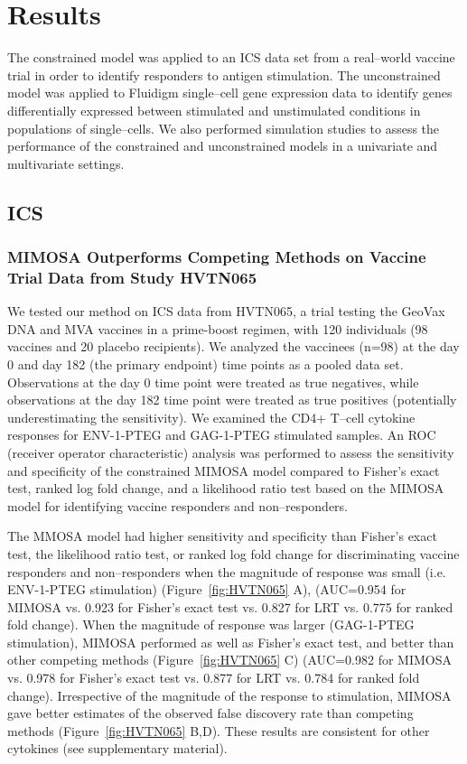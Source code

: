 \documentclass[11pt]{article}
\begin{document}
\section{Results}
The constrained model was applied to an ICS data set from a real--world vaccine trial in order to identify responders to antigen stimulation. The unconstrained model was applied to Fluidigm single--cell gene expression data to identify genes differentially expressed between stimulated and unstimulated conditions in populations of single--cells. We also performed simulation studies to assess the performance of the constrained and unconstrained models in a univariate and multivariate settings.

\subsection{ICS}
\subsubsection*{MIMOSA Outperforms Competing Methods on Vaccine Trial Data from Study HVTN065}

We tested our method on ICS data from HVTN065,  a trial testing the GeoVax DNA and MVA vaccines in a prime-boost regimen, with 120 individuals (98 vaccines and 20 placebo recipients). We analyzed the vaccinees (n=98) at the day 0 and day 182 (the primary endpoint) time points as a pooled data set. Observations at the day 0 time point were treated as true negatives, while observations at the day 182 time point were treated as true positives (potentially underestimating the sensitivity). We examined the CD4+ T--cell cytokine responses for ENV-1-PTEG and GAG-1-PTEG stimulated samples. An ROC (receiver operator characteristic) analysis was performed to assess the sensitivity and specificity of the constrained MIMOSA model compared to Fisher's exact test, ranked log fold change, and a likelihood ratio test based on the MIMOSA model for identifying vaccine responders and non--responders. 

The MMOSA model had higher sensitivity and specificity than Fisher's exact test, the likelihood ratio test, or ranked log fold change for discriminating vaccine responders and non--responders when the magnitude of response was small (i.e. ENV-1-PTEG stimulation) (Figure~\ref{fig:HVTN065} A),  (AUC=0.954 for MIMOSA vs. 0.923 for Fisher's exact test vs. 0.827 for LRT vs. 0.775 for ranked fold change). When the magnitude of response was larger (GAG-1-PTEG stimulation), MIMOSA performed as well as Fisher's exact test, and better than other competing methods (Figure~\ref{fig:HVTN065} C) (AUC=0.982 for MIMOSA vs. 0.978 for Fisher's exact test vs. 0.877 for LRT vs. 0.784 for ranked fold change). Irrespective of the magnitude of the response to stimulation, MIMOSA gave better estimates of the observed false discovery rate than competing methods (Figure~\ref{fig:HVTN065} B,D). These results are consistent for other cytokines (see supplementary material).
\end{document}
